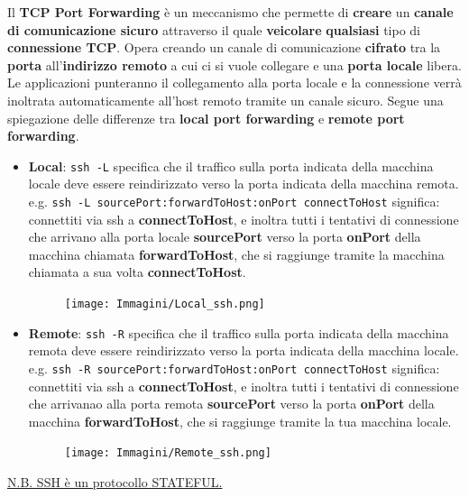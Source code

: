 \documentclass[11pt,a4paper,oneside]{book}
\theoremstyle{definition}
\begin{document}
Il \textbf{TCP Port Forwarding} è un meccanismo che permette di \textbf{creare} un \textbf{canale di comunicazione sicuro} attraverso il quale \textbf{veicolare} \textbf{qualsiasi} tipo di \textbf{connessione TCP}. Opera creando un canale di comunicazione \textbf{cifrato} tra la \textbf{porta} all’\textbf{indirizzo remoto} a cui ci si vuole collegare e una \textbf{porta locale} libera. Le applicazioni punteranno il collegamento alla porta locale e la connessione verrà inoltrata automaticamente all’host remoto
tramite un canale sicuro. \newline Segue una spiegazione delle differenze tra \textbf{local port forwarding} e \textbf{remote port forwarding}.

\pagebreak

\begin{itemize}
	\item \textbf{Local}: \texttt{ssh -L} specifica che il traffico sulla porta indicata della macchina locale deve essere reindirizzato verso la porta indicata della macchina remota. \newline
	      e.g. \texttt{ssh -L sourcePort:forwardToHost:onPort connectToHost} significa: connettiti via ssh a \textbf{connectToHost}, e inoltra tutti i tentativi di connessione che arrivano alla porta locale \textbf{sourcePort} verso la porta \textbf{onPort} della macchina chiamata \textbf{forwardToHost}, che si raggiunge tramite la macchina chiamata a sua volta \textbf{connectToHost}.
	      \begin{figure}[!h]
		      \texttt{[image: Immagini/Local\_ssh.png]}
		      \centering
	      \end{figure}

	      \pagebreak

	\item \textbf{Remote}: \texttt{ssh -R} specifica che il traffico sulla porta indicata della macchina remota deve essere reindirizzato verso la porta indicata della macchina locale.\newline
	      e.g. \texttt{ssh -R sourcePort:forwardToHost:onPort connectToHost} significa: connettiti via ssh a \textbf{connectToHost}, e inoltra tutti i tentativi di connessione che arrivanao alla porta remota \textbf{sourcePort} verso la porta \textbf{onPort} della macchina \textbf{forwardToHost}, che si raggiunge tramite la tua macchina locale.
	      \begin{figure}[!h]
		      \texttt{[image: Immagini/Remote\_ssh.png]}
		      \centering
	      \end{figure}
\end{itemize}
\underline{N.B. SSH è un protocollo STATEFUL.}
\end{document}
